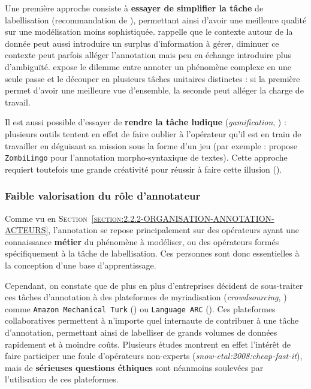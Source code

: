 			\begin{leftBarIdea}
				Une première approche consiste à \textbf{essayer de simplifier la tâche} de labellisation (recommandation de \cite{bayerl-paul:2011:what-determines-intercoder}), permettant ainsi d'avoir une meilleure qualité sur une modélisation moins sophistiquée.
				\cite{fort-etal:2012:modeling-complexity-manual} rappelle que le contexte autour de la donnée peut aussi introduire un surplus d'information à gérer, diminuer ce contexte peut parfois alléger l'annotation mais peu en échange introduire plus d'ambiguïté.
				\cite{baledent:2022:complexite-annotation-manuelle} expose le dilemme entre annoter un phénomène complexe en une seule passe et le découper en plusieurs tâches unitaires distinctes : si la première permet d'avoir une meilleure vue d'ensemble, la seconde peut alléger la charge de travail.
				
				Il est aussi possible d'essayer de \textbf{rendre la tâche ludique} (\textit{gamification}, \cite{von-ahn:2006:games-purpose}) : plusieurs outils tentent en effet de faire oublier à l'opérateur qu'il est en train de travailler en déguisant sa mission sous la forme d'un jeu (par exemple : \cite{guillaume-etal:2016:crowdsourcing-complex-language} propose \texttt{ZombiLingo} pour l'annotation morpho-syntaxique de textes).
				Cette approche requiert toutefois une grande créativité pour réussir à faire cette illusion (\cite{fort:2017:experts-ou-foule}).
			\end{leftBarIdea}
		
		
		\subsubsection{Faible valorisation du rôle d'annotateur}
		\label{section:2.3.3.C-DEFIS-ANNOTATION-ASPECT-HUMAIN-ESCLAVAGE}
			
			Comme vu en \textsc{Section~\ref{section:2.2.2-ORGANISATION-ANNOTATION-ACTEURS}}, l'annotation se repose principalement sur des opérateurs ayant une connaissance \textbf{métier} du phénomène à modéliser, ou des opérateurs formés spécifiquement à la tâche de labellisation.
			Ces personnes sont donc essentielles à la conception d'une base d'apprentissage.
			
			Cependant, on constate que de plus en plus d'entreprises décident de sous-traiter ces tâches d'annotation à des plateformes de myriadisation (\textit{crowdsourcing}, \cite{howe:2008:crowdsourcing-how-power}) comme \texttt{Amazon Mechanical Turk} (\cite{callison-burch-dredze:2010:creating-speech-language}) ou \texttt{Language ARC} (\cite{fiumara-etal:2020:languagearc-developing-language}).
			Ces plateformes collaboratives permettent à n'importe quel internaute de contribuer à une tâche d'annotation, permettant ainsi de labelliser de grands volumes de données rapidement et à moindre coûts.
			Plusieurs études montrent en effet l'intérêt de faire participer une foule d'opérateurs non-experts (\textit{snow-etal:2008:cheap-fast-it}), mais de \textbf{sérieuses questions éthiques} sont néanmoins soulevées par l'utilisation de ces plateformes.
			
